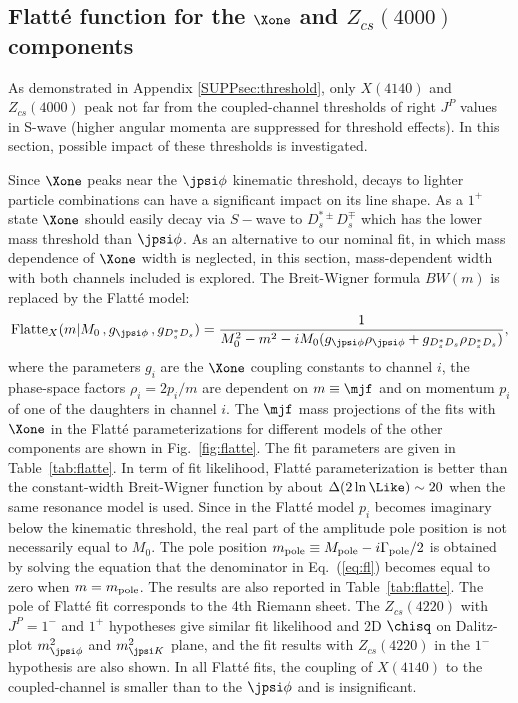
\subsection{Flatt\'e function for the $\Xone$ and $Z_{cs}(4000)$ components}
\label{sec:flatte}

As demonstrated in Appendix \ref{SUPPsec:threshold}, 
only $X(4140)$ and $Z_{cs}(4000)$ peak not far from the coupled-channel thresholds of right $J^P$ values in S-wave (higher angular momenta are suppressed for threshold effects). 
In this section,
possible impact of these thresholds is investigated.

Since $\Xone$ peaks near the $\jpsi\phi$ kinematic threshold, 
decays to lighter particle combinations can have a significant impact on its line shape.
As a $1^+$ state $\Xone$ should easily decay via $S-$wave to $D_s^{*\pm}D_s^{\mp}$ which has the lower mass threshold than $\jpsi\phi$.
As an alternative to our nominal fit, 
in which mass dependence of $\Xone$ width is neglected, 
in this section,
mass-dependent width with both channels included is explored. 
The Breit-Wigner formula $BW(m)$ is replaced by the Flatt\'e model: 
\begin{equation}
{\rm Flatte}_X(m|M_0\,,g_{\jpsi\phi}\,,g_{D_s^*D_s})=\frac{1}{M_0^2-m^2-iM_0(g_{\jpsi\phi}\rho_{\jpsi \phi}+g_{D_s^*D_s}\rho_{D_s^*D_s})},
\label{eq:fl}
\end{equation}
where the parameters $g_i$ are the $\Xone$ coupling constants to channel $i$, 
the phase-space factors $\rho_i=2p_i/m$ are dependent on $m\equiv\mjf$ and on momentum $p_i$ of one of the daughters in channel $i$. 
The $\mjf$ mass projections of the fits with $\Xone$ in the Flatt\'e parameterizations for different models of the other components are shown in Fig.~\ref{fig:flatte}. 
The fit parameters are given in Table~\ref{tab:flatte}.  
In term of fit likelihood, 
Flatt\'e parameterization is better than the constant-width Breit-Wigner function by about $\Delta(2\ln\Like)\sim20$ when the same resonance model is used. 
Since in the Flatt\'e model $p_i$ becomes imaginary below the kinematic threshold, 
the real part of the amplitude pole position is not necessarily equal to $M_0$. 
The pole position $m_{\rm pole}\equiv M_{\rm pole}- i\Gamma_{\rm pole}/2$ is obtained by solving the equation that the denominator in Eq.~(\ref{eq:fl}) becomes equal to zero when $m=m_{\rm pole}$. 
The results are also reported in Table~\ref{tab:flatte}. 
The pole of Flatt\'e fit corresponds to the 4th Riemann sheet. 
The $Z_{cs}(4220)$ with $J^P=1^{-}$ and $1^+$ hypotheses give similar fit likelihood and 2D $\chisq$ on Dalitz-plot $m^2_{\jpsi\phi}$ and $m^2_{\jpsi K}$ plane, 
and the fit results with $Z_{cs}(4220)$ in the $1^-$ hypothesis are also shown.
In all Flatt\'e fits, 
the coupling of $X(4140)$ to the coupled-channel is smaller than to the $\jpsi\phi$ and is insignificant. 


